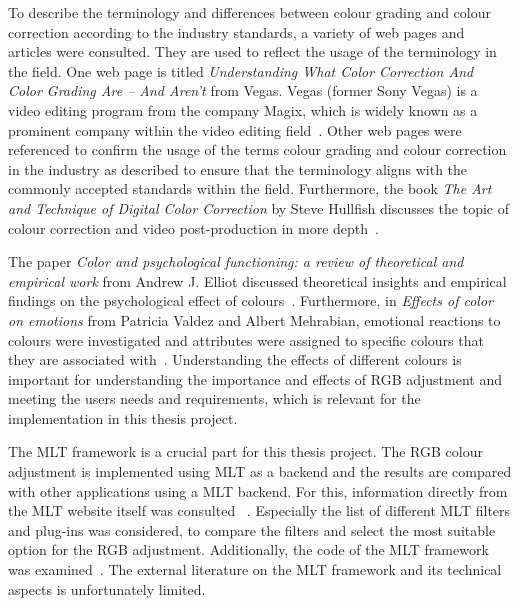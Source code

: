 \documentclass[../MasterThesis.tex]{subfiles}
\begin{document}
\begin{description}[font=\color{RedViolet!80!black}, style=nextline]
		To describe the terminology and differences between colour grading and colour correction according to the industry standards, a variety of web pages and articles were consulted. They are used to reflect the usage of the terminology in the field. 
		One web page is titled \textit{Understanding What Color Correction And Color Grading Are – And Aren’t} from Vegas. Vegas (former Sony Vegas) is a video editing program from the company Magix, which is widely known as a prominent company within the video editing field~\cite{cc_cg_1}.
		Other web pages were referenced to confirm the usage of the terms colour grading and colour correction in the industry as described to ensure that the terminology aligns with the commonly accepted standards within the field. 
		Furthermore, the book \textit{The Art and Technique of Digital Color Correction} by Steve Hullfish discusses the topic of colour correction and video post-production in more depth~\cite{cc1}.
		
		
		
		\item[Effects of different colour]
		
		
		The paper \textit{Color and psychological functioning: a review of theoretical and empirical work} from Andrew J. Elliot discussed theoretical insights and empirical findings on the psychological effect of colours~\cite{colour}.
		Furthermore, in \textit{Effects of color on emotions} from Patricia Valdez and Albert Mehrabian, emotional reactions to colours were investigated and attributes were assigned to specific colours that they are associated with~\cite{colour2}.
		Understanding the effects of different colours is important for understanding the importance and effects of RGB adjustment and meeting the users needs and requirements, which is relevant for the implementation in this thesis project.
		
	
		
		
		\item[MLT framework]
		
		
		The MLT framework is a crucial part for this thesis project. 
		The RGB colour adjustment is implemented using MLT as a backend and the results are compared with other applications using a MLT backend.
		For this, information directly from the MLT website itself was consulted~\cite{melt} .
		Especially the list of different MLT filters and plug-ins was considered, to compare the filters and select the most suitable option for the RGB adjustment.
		Additionally, the code of the MLT framework was examined~\cite{melt_filters, melt_code}.
		The external literature on the MLT framework and its technical aspects is unfortunately limited.
		

\end{description}
\end{document}
